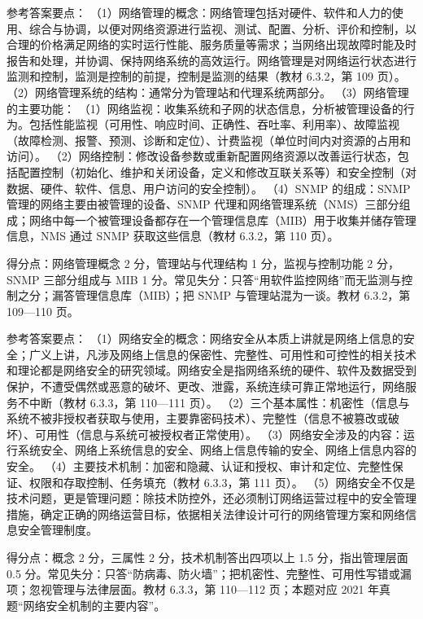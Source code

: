\documentclass[a4paper,11pt]{article}
\begin{document}
\q 参考答案要点：
（1）网络管理的概念：网络管理包括对硬件、软件和人力的使用、综合与协调，以便对网络资源进行监视、测试、配置、分析、评价和控制，以合理的价格满足网络的实时运行性能、服务质量等需求；当网络出现故障时能及时报告和处理，并协调、保持网络系统的高效运行。网络管理是对网络运行状态进行监测和控制，监测是控制的前提，控制是监测的结果（教材 6.3.2，第 109 页）。
（2）网络管理系统的结构：通常分为管理站和代理系统两部分。
（3）网络管理的主要功能：
（1）网络监视：收集系统和子网的状态信息，分析被管理设备的行为。包括性能监视（可用性、响应时间、正确性、吞吐率、利用率）、故障监视（故障检测、报警、预测、诊断和定位）、计费监视（单位时间内对资源的占用和访问）。
（2）网络控制：修改设备参数或重新配置网络资源以改善运行状态，包括配置控制（初始化、维护和关闭设备，定义和修改互联关系等）和安全控制（对数据、硬件、软件、信息、用户访问的安全控制）。
（4）SNMP 的组成：SNMP 管理的网络主要由被管理的设备、SNMP 代理和网络管理系统（NMS）三部分组成；网络中每一个被管理设备都存在一个管理信息库（MIB）用于收集并储存管理信息，NMS 通过 SNMP 获取这些信息（教材 6.3.2，第 110 页）。
\begin{analysis}得分点：网络管理概念 2 分，管理站与代理结构 1 分，监视与控制功能 2 分，SNMP 三部分组成与 MIB 1 分。常见失分：只答“用软件监控网络”而无监测与控制之分；漏答管理信息库（MIB）；把 SNMP 与管理站混为一谈。教材 6.3.2，第 109—110 页。\end{analysis}

\q 参考答案要点：
（1）网络安全的概念：网络安全从本质上讲就是网络上信息的安全；广义上讲，凡涉及网络上信息的保密性、完整性、可用性和可控性的相关技术和理论都是网络安全的研究领域。网络安全是指网络系统的硬件、软件及数据受到保护，不遭受偶然或恶意的破坏、更改、泄露，系统连续可靠正常地运行，网络服务不中断（教材 6.3.3，第 110—111 页）。
（2）三个基本属性：机密性（信息与系统不被非授权者获取与使用，主要靠密码技术）、完整性（信息不被篡改或破坏）、可用性（信息与系统可被授权者正常使用）。
（3）网络安全涉及的内容：运行系统安全、网络上系统信息的安全、网络上信息传输的安全、网络上信息内容的安全。
（4）主要技术机制：加密和隐藏、认证和授权、审计和定位、完整性保证、权限和存取控制、任务填充（教材 6.3.3，第 111 页）。
（5）网络安全不仅是技术问题，更是管理问题：除技术防控外，还必须制订网络运营过程中的安全管理措施，确定正确的网络运营目标，依据相关法律设计可行的网络管理方案和网络信息安全管理制度。
\begin{analysis}得分点：概念 2 分，三属性 2 分，技术机制答出四项以上 1.5 分，指出管理层面 0.5 分。常见失分：只答“防病毒、防火墙”；把机密性、完整性、可用性写错或漏项；忽视管理与法律层面。教材 6.3.3，第 110—112 页；本题对应 2021 年真题“网络安全机制的主要内容”。\end{analysis}
\end{document}

